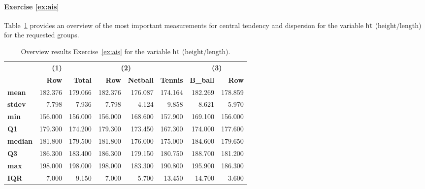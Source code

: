 \paragraph{Exercise \ref{ex:ais}}

Table~\ref{tab:opl-ais-ht} provides an overview of the most important measurements for central tendency and dispersion for the variable \texttt{ht} (height/length) for the requested groups.

\begin{table}
  \centering
  \begin{tabular}{@{}l|r|rrrr|rr@{}}
    \toprule
    & \textbf{(1)} & \multicolumn{4}{c}{\textbf{(2)}}                                                 & \multicolumn{2}{c}{\textbf{(3)}} \\ 
    & \textbf{Row} & \textbf{Total}    & \textbf{Row} & \textbf{Netball} & \textbf{Tennis} & \textbf{B\_ball}  & \textbf{Row} \\ \midrule
    \textbf{mean}       & 182.376      & 179.066                      & 182.376      & 176.087          & 174.164         & 182.269           & 178.859      \\
    \textbf{stdev}      & 7.798        & 7.936                        & 7.798        & 4.124            & 9.858           & 8.621             & 5.970        \\
    \textbf{min}        & 156.000      & 156.000                      & 156.000      & 168.600          & 157.900         & 169.100           & 156.000      \\
    \textbf{Q1}         & 179.300      & 174.200                      & 179.300      & 173.450          & 167.300         & 174.000           & 177.600      \\
    \textbf{median}     & 181.800      & 179.500                      & 181.800      & 176.000          & 175.000         & 184.600           & 179.650      \\
    \textbf{Q3}         & 186.300      & 183.400                      & 186.300      & 179.150          & 180.750         & 188.700           & 181.200      \\
    \textbf{max}        & 198.000      & 198.000                      & 198.000      & 183.300          & 190.800         & 195.900           & 186.300      \\
    \textbf{IQR}        & 7.000        & 9.150                        & 7.000        & 5.700            & 13.450          & 14.700            & 3.600        \\ \bottomrule
  \end{tabular}
  \caption{Overview results Exercise~\ref{ex:ais} for the variable \texttt{ht} (height/length).}
  \label{tab:opl-ais-ht}
\end{table}

